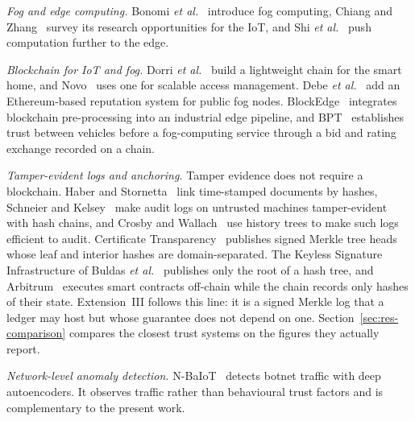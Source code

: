 \documentclass{ieeeaccess}
\begin{document}
\emph{Fog and edge computing.}  Bonomi \textit{et
al.}~\cite{bonomi2012fog} introduce fog computing, Chiang and
Zhang~\cite{chiang2016fog} survey its research opportunities for the
IoT, and Shi \textit{et
al.}~\cite{shi2016edge} push computation further to the edge.

\emph{Blockchain for IoT and fog.}  Dorri \textit{et
al.}~\cite{dorri2017blockchain} build a lightweight chain for the smart
home, and Novo~\cite{novo2018blockchain} uses one for scalable access
management.  Debe \textit{et
al.}~\cite{debe2019iot} add an Ethereum-based reputation system for
public fog nodes.  BlockEdge~\cite{kumar2020blockedge} integrates
blockchain pre-processing into an industrial edge pipeline, and
BPT~\cite{dewanta2021bpt} establishes trust between vehicles before a
fog-computing service through a bid and rating exchange recorded on a
chain.

\emph{Tamper-evident logs and anchoring.}  Tamper evidence does not
require a blockchain.  Haber and Stornetta~\cite{haber1991time} link
time-stamped documents by hashes, Schneier and
Kelsey~\cite{schneier1999secure} make audit logs on untrusted machines
tamper-evident with hash chains, and Crosby and
Wallach~\cite{crosby2009efficient} use history trees to make such logs
efficient to audit.  Certificate
Transparency~\cite{laurie2013rfc6962} publishes signed Merkle tree
heads whose leaf and interior hashes are domain-separated.  The
Keyless Signature Infrastructure of Buldas \textit{et
al.}~\cite{buldas2013ksi} publishes only the root of a hash tree, and
Arbitrum~\cite{kalodner2018arbitrum} executes smart contracts
off-chain while the chain records only hashes of their state.
Extension~III follows this line: it is a signed Merkle log that a
ledger may host but whose guarantee does not depend on one.
Section~\ref{sec:res-comparison} compares the closest trust systems on
the figures they actually report.

\emph{Network-level anomaly detection.}  N-BaIoT~\cite{meidan2018nbaiot}
detects botnet traffic with deep autoencoders.  It observes traffic
rather than behavioural trust factors and is complementary to the
present work.

\end{document}
